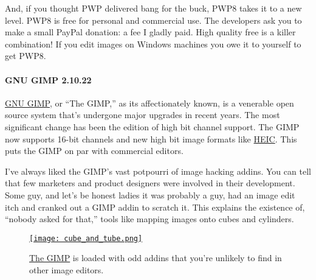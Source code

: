 And, if you thought PWP delivered bang for the buck, PWP8 takes it to a
new level. PWP8 is free for personal and commercial use. The developers
ask you to make a small PayPal donation: a fee I gladly paid. High
quality free is a killer combination! If you edit images on Windows
machines you owe it to yourself to get PWP8.

\paragraph{GNU GIMP 2.10.22}\label{gnu-gimp-2.10.22}

\href{https://www.gimp.org/}{GNU GIMP}, or ``The GIMP,'' as its
affectionately known, is a venerable open source system that's undergone
major upgrades in recent years. The most significant change has been the
edition of high bit channel support. The GIMP now supports 16-bit
channels and new high bit image formats like
\href{https://www.macworld.co.uk/feature/what-is-heic-3660408/}{HEIC}.
This puts the GIMP on par with commercial editors.

I've always liked the GIMP's vast potpourri of image hacking addins. You
can tell that few marketers and product designers were involved in their
development. Some guy, and let's be honest ladies it was probably a guy,
had an image edit itch and cranked out a GIMP addin to scratch it. This
explains the existence of, ``nobody asked for that,'' tools like mapping
images onto cubes and cylinders.



\captionsetup[figure]{labelformat=empty}
\begin{SCfigure}
\centering
\href{https://conceptcontrol.smugmug.com/Themes/Manipulations/Alpha-Layered/i-HjsC9Lp/A}{\texttt{[image: cube\_and\_tube.png]}}
\caption[\href{https://www.gimp.org/}{The GIMP} is loaded with odd addins]{\href{https://www.gimp.org/}{The GIMP} is loaded with odd addins that
you're unlikely to find in other image editors.}
\label{fig:7048X5}
\end{SCfigure}

